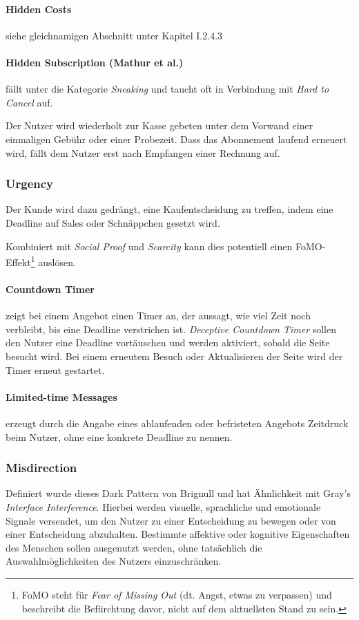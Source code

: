 \documentclass[a4paper]{article}
\newcommand{\todo}[1]{{\color{purple}{#1}}}
\begin{document}
\paragraph{Hidden Costs}
siehe gleichnamigen Abschnitt unter Kapitel I.2.4.3 
\todo{Verlinkung hinzufügen}

\paragraph{Hidden Subscription (Mathur et al.)} fällt unter die Kategorie \textit{Sneaking} und taucht oft in Verbindung mit \textit{Hard to Cancel} auf. 

Der Nutzer wird wiederholt zur Kasse gebeten unter dem Vorwand einer einmaligen Gebühr oder einer Probezeit. Dass das Abonnement laufend erneuert wird, fällt dem Nutzer erst nach Empfangen einer Rechnung auf.  

\subsubsection{Urgency}

Der Kunde wird dazu gedrängt, eine Kaufentscheidung zu treffen, indem eine Deadline auf Sales oder Schnäppchen gesetzt wird. 

Kombiniert mit \textit{Social Proof} und \textit{Scarcity} kann dies potentiell einen FoMO-Effekt\footnote{\label{foot:4} FoMO steht für \textit{Fear of Missing Out} (dt. Angst, etwas zu verpassen) und beschreibt die Befürchtung davor, nicht auf dem aktuellsten Stand zu sein.} auslösen.

\paragraph{Countdown Timer} zeigt bei einem Angebot einen Timer an, der aussagt, wie viel Zeit noch verbleibt, bis eine Deadline verstrichen ist. \textit{Deceptive Countdown Timer} sollen den Nutzer eine Deadline vortäuschen und werden aktiviert, sobald die Seite besucht wird. Bei einem erneutem Besuch oder Aktualisieren der Seite wird der Timer erneut gestartet.

\paragraph{Limited-time Messages} erzeugt durch die Angabe eines ablaufenden oder befristeten Angebots Zeitdruck beim Nutzer, ohne eine konkrete Deadline zu nennen.

\subsubsection{Misdirection}
Definiert wurde dieses Dark Pattern von Brignull und hat Ähnlichkeit mit Gray's \textit{Interface Interference}.
Hierbei werden visuelle, sprachliche und emotionale Signale versendet, um den Nutzer zu einer Entscheidung zu bewegen oder von einer Entscheidung abzuhalten. Bestimmte affektive oder kognitive Eigenschaften des Menschen sollen ausgenutzt werden, ohne tatsächlich die Auswahlmöglichkeiten des Nutzers einzuschränken.
\end{document}
